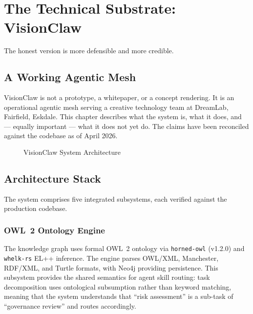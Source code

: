 \chapter{The Technical Substrate: VisionClaw}
\label{ch:technical-substrate}

\epigraph{The honest version is more defensible and more credible.}{}

\section{A Working Agentic Mesh}

VisionClaw is not a prototype, a whitepaper, or a concept rendering. It is an operational agentic mesh serving a creative technology team at DreamLab, Fairfield, Eskdale. This chapter describes what the system is, what it does, and --- equally important --- what it does not yet do. The claims have been reconciled against the codebase as of April 2026.

\begin{figure}[h]
\centering
{}
\caption{VisionClaw System Architecture}
\label{fig:visionclaw-arch}
\end{figure}

\section{Architecture Stack}

The system comprises five integrated subsystems, each verified against the production codebase.

\subsection{OWL~2 Ontology Engine}

The knowledge graph uses formal OWL~2 ontology via \texttt{horned-owl} (v1.2.0) and \texttt{whelk-rs} EL++ inference. The engine parses OWL/XML, Manchester, RDF/XML, and Turtle formats, with Neo4j providing persistence. This subsystem provides the shared semantics for agent skill routing: task decomposition uses ontological subsumption rather than keyword matching, meaning that the system understands that ``risk assessment'' is a sub-task of ``governance review'' and routes accordingly.

